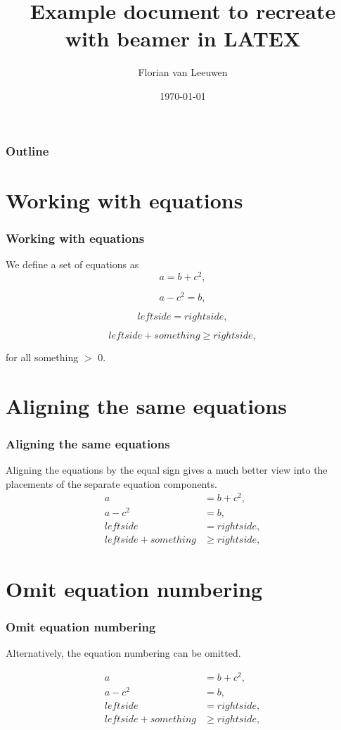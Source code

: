 \documentclass{beamer}
\title{Example document to recreate with beamer in LATEX} %
\author{Florian van Leeuwen} %
\date{\today} %
\institute[UU] %
{
Markup Languages and Reproducible Programming in Statistics \\ %

}
\begin{document}
\begin{frame}
\titlepage %
\end{frame}

\begin{frame}
\frametitle{Outline} %
\tableofcontents
\end{frame}

\section{Working with equations}
\begin{frame}
\frametitle{Working with equations}
We define a set of equations as
\begin{equation}
\label{eq1}
a = b + c^2,
\end{equation}

\begin{equation}
\label{eq2}
a - c^2 = b,
\end{equation}

\begin{equation}
\label{eq3}
left side = right side,
\end{equation}

\begin{equation}
\label{eq4}
left side + something \geq right side,
\end{equation}

for all something $>$ 0.

\end{frame}

\section{Aligning the same equations}
\begin{frame}
\frametitle{Aligning the same equations}
Aligning the equations by the equal sign gives a much better view into the placements of the separate equation components.
\begin{align}
a &= b + c^2, \\
a - c^2 &= b, \\
left side &= right side, \\
left side + something &\geq right side,
\end{align}


\end{frame}

\section{Omit equation numbering}
\begin{frame}
\frametitle{Omit equation numbering}
Alternatively, the equation numbering can be omitted.

\begin{align*}
a &= b + c^2, \\
a - c^2 &= b, \\
left side &= right side, \\
left side + something &\geq right side,
\end{align*}
\end{frame}
\end{document}

